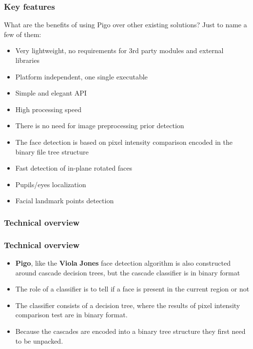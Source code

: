 \documentclass[9pt]{beamer}
\begin{document}
\begin{frame}[fragile]
\frametitle{Key features}


What are the benefits of using Pigo over other existing solutions? Just to name a few of them:


\begin{itemize}
\item Very lightweight, no requirements for 3rd party modules and external libraries
\item Platform independent, one single executable
\item Simple and elegant API
\item High processing speed
\item There is no need for image preprocessing prior detection
\item The face detection is based on pixel intensity comparison encoded in the binary file tree structure
\item Fast detection of in-plane rotated faces
\item Pupils/eyes localization
\item Facial landmark points detection
\end{itemize}


\end{frame}

\begin{frame}[fragile]
\frametitle{Technical overview}


\end{frame}

\begin{frame}[fragile]
\frametitle{Technical overview}


\begin{itemize}
\item \textbf{Pigo}, like the \textbf{Viola} \textbf{Jones} face detection algorithm is also constructed around cascade decision trees, but the cascade classifier is in binary format
\item The role of a classifier is to tell if a face is present in the current region or not
\item The classifier consists of a decision tree, where the results of pixel intensity comparison test are in binary format.
\item Because the cascades are encoded into a binary tree structure they first need to be unpacked.
\end{itemize}


\end{frame}
\end{document}
